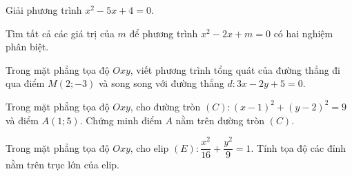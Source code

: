 
\NQuestion
\begin{SubQuestions}
\item Giải phương trình $x^2-5x+4=0$.
\item Tìm tất cả các giá trị của $m$ để phương trình $x^2-2x+m=0$ có hai nghiệm phân biệt.
\end{SubQuestions}

\NQuestion Trong mặt phẳng tọa độ $Oxy$, viết phương trình tổng quát của đường thẳng đi qua điểm $M(2;-3)$ và song song với đường thẳng $d:3x-2y+5=0$.

\NQuestion Trong mặt phẳng tọa độ $Oxy$, cho đường tròn $(C):(x-1)^2+(y-2)^2=9$ và điểm $A(1;5)$. Chứng minh điểm $A$ nằm trên đường tròn $(C)$.

\NQuestion Trong mặt phẳng tọa độ $Oxy$, cho elip $(E):\dfrac{x^2}{16}+\dfrac{y^2}{9}=1$. Tính tọa độ các đỉnh nằm trên trục lớn của elip.
